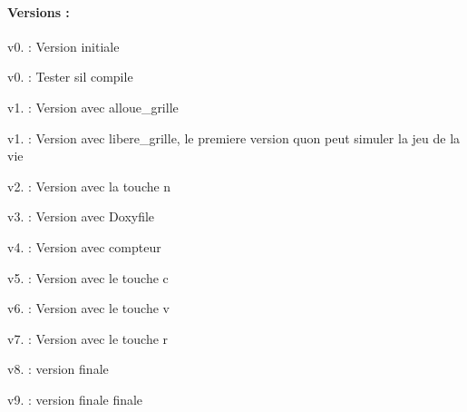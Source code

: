 \paragraph*{Versions \+:}


\begin{DoxyItemize}
\item v0. \+: Version initiale
\item v0. \+: Tester s\textquotesingle{}il compile
\item v1. \+: Version avec alloue\+\_\+grille
\item v1. \+: Version avec libere\+\_\+grille, le premiere version qu\textquotesingle{}on peut simuler la jeu de la vie
\item v2. \+: Version avec la touche \textquotesingle{}n\textquotesingle{}
\item v3. \+: Version avec Doxyfile
\item v4. \+: Version avec compteur
\item v5. \+: Version avec le touche \textquotesingle{}c\textquotesingle{}
\item v6. \+: Version avec le touche \textquotesingle{}v\textquotesingle{}
\item v7. \+: Version avec le touche \textquotesingle{}r\textquotesingle{}
\item v8. \+: version finale
\item v9. \+: version finale finale 
\end{DoxyItemize}